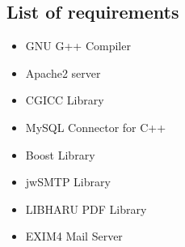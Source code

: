 \subsection{List of requirements}
\vskip 0.5cm
\begin{itemize}
\item GNU G++ Compiler
\item Apache2 server 
\item CGICC Library 
\item MySQL Connector for C++ 
\item Boost Library
\item jwSMTP Library  
\item LIBHARU PDF Library 
\item EXIM4 Mail Server
\end{itemize}

